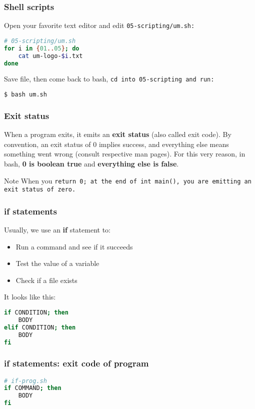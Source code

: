 \begin{frame}[fragile]
\frametitle{Shell scripts}
Open your favorite text editor and edit \tt{05-scripting/um.sh}:
\begin{lstlisting}[language=bash]
# 05-scripting/um.sh
for i in {01..05}; do
    cat um-logo-$i.txt
done
\end{lstlisting}
Save file, then come back to bash, \tt{cd} into \tt{05-scripting} and run:
\begin{lstlisting}[language=bash]
$ bash um.sh
\end{lstlisting}
\end{frame}

\begin{frame}
\frametitle{Exit status}
When a program exits, it emits an \textbf{exit status} (also called exit code).
By convention, an exit status of 0 implies success, and everything else means
something went wrong (consult respective man pages).
\newline \newline
For this very reason, in bash, \textbf{0 is boolean true} and
\textbf{everything else is false}.

\begin{block}{Note}
    When you \tt{return 0;} at the end of \tt{int main()}, you are
    emitting an exit status of zero.
\end{block}
\end{frame}

\begin{frame}[fragile]
\frametitle{\textbf{if} statements}
Usually, we use an \textbf{if} statement to:
\begin{itemize}
    \item Run a command and see if it succeeds
    \item Test the value of a variable
    \item Check if a file exists
\end{itemize}
It looks like this:
\begin{lstlisting}[language=bash]
if CONDITION; then
    BODY
elif CONDITION; then
    BODY
fi
\end{lstlisting}
\end{frame}

\begin{frame}[fragile]
\frametitle{\textbf{if} statements: exit code of program}
\begin{lstlisting}[language=bash]
# if-prog.sh
if COMMAND; then
    BODY
fi
\end{lstlisting}
\end{frame}

